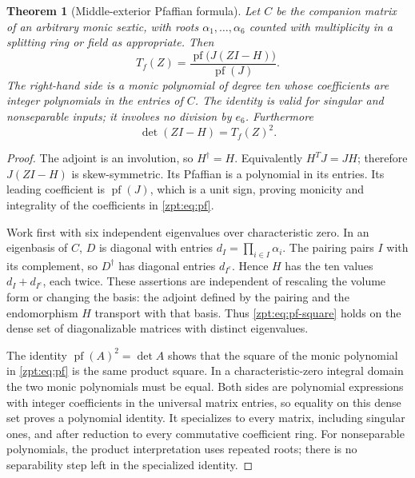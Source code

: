 \documentclass[11pt,letterpaper]{article}
\numberwithin{equation}{section}
\newtheorem{theorem}{Theorem}[section]
\theoremstyle{definition}
\theoremstyle{remark}
\DeclareMathOperator{\pf}{pf}
\begin{document}
\begin{theorem}[Middle-exterior Pfaffian formula]
\label{zpt:thm:pf}
Let $C$ be the companion matrix of an arbitrary monic sextic, with roots
$\alpha_1,\ldots,\alpha_6$ counted with multiplicity in a splitting ring or
field as appropriate. Then
\begin{equation}
 \boxed{\quad
 T_f(Z)=\frac{\pf\bigl(J(ZI-H)\bigr)}{\pf(J)}.
 \quad}\label{zpt:eq:pf}
\end{equation}
The right-hand side is a monic polynomial of degree ten whose coefficients
are integer polynomials in the entries of $C$. The identity is valid for
singular and nonseparable inputs; it involves no division by $e_6$.
Furthermore
\begin{equation}
 \det(ZI-H)=T_f(Z)^2.\label{zpt:eq:pf-square}
\end{equation}
\end{theorem}
\begin{proof}
The adjoint is an involution, so $H^\dagger=H$. Equivalently $H^TJ=JH$;
therefore $J(ZI-H)$ is skew-symmetric. Its Pfaffian is a polynomial in its
entries. Its leading coefficient is $\pf(J)$, which is a unit sign, proving
monicity and integrality of the coefficients in \eqref{zpt:eq:pf}.

Work first with six independent eigenvalues over characteristic zero.
In an eigenbasis of $C$, $D$ is diagonal with entries
$d_I=\prod_{i\in I}\alpha_i$. The pairing pairs $I$ with its complement,
so $D^\dagger$ has diagonal entries $d_{I^c}$. Hence $H$ has the ten
values $d_I+d_{I^c}$, each twice. These assertions are independent of
rescaling the volume form or changing the basis: the adjoint defined by
the pairing and the endomorphism $H$ transport with that basis. Thus
\eqref{zpt:eq:pf-square} holds on the dense set of diagonalizable matrices
with distinct eigenvalues.

The identity $\pf(A)^2=\det A$ shows that the square of the monic
polynomial in \eqref{zpt:eq:pf} is the same product square. In a
characteristic-zero integral domain the two monic polynomials must be
equal. Both sides are polynomial expressions with integer coefficients
in the universal matrix entries, so equality on this dense set proves a
polynomial identity. It specializes to every matrix, including singular
ones, and after reduction to every commutative coefficient ring. For
nonseparable polynomials, the product interpretation uses repeated roots;
there is no separability step left in the specialized identity.
\end{proof}
\end{document}
